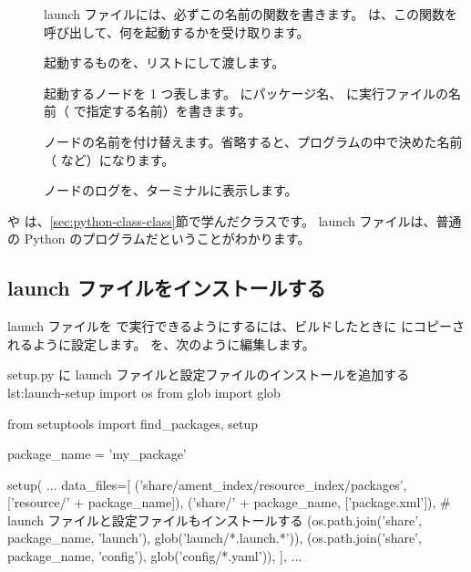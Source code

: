 

\begin{description}
  \item[] launch ファイルには、必ずこの名前の関数を書きます。 は、この関数を呼び出して、何を起動するかを受け取ります。
  \item[] 起動するものを、リストにして渡します。
  \item[] 起動するノードを 1 つ表します。 にパッケージ名、 に実行ファイルの名前（ で指定する名前）を書きます。
  \item[] ノードの名前を付け替えます。省略すると、プログラムの中で決めた名前（ など）になります。
  \item[] ノードのログを、ターミナルに表示します。
\end{description}

 や  は、\ref{sec:python-class-class}節で学んだクラスです。
launch ファイルは、普通の Python のプログラムだということがわかります。

\subsection{launch ファイルをインストールする}

launch ファイルを  で実行できるようにするには、ビルドしたときに  にコピーされるように設定します。
 を、次のように編集します。

\begin{codelisting}[style=python]{setup.py に launch ファイルと設定ファイルのインストールを追加する}{lst:launch-setup}
import os
from glob import glob

from setuptools import find_packages, setup

package_name = 'my_package'

setup(
    ...
    data_files=[
        ('share/ament_index/resource_index/packages',
            ['resource/' + package_name]),
        ('share/' + package_name, ['package.xml']),
        # launch ファイルと設定ファイルもインストールする
        (os.path.join('share', package_name, 'launch'),
            glob('launch/*.launch.*')),
        (os.path.join('share', package_name, 'config'),
            glob('config/*.yaml')),
    ],
    ...
\end{codelisting}

